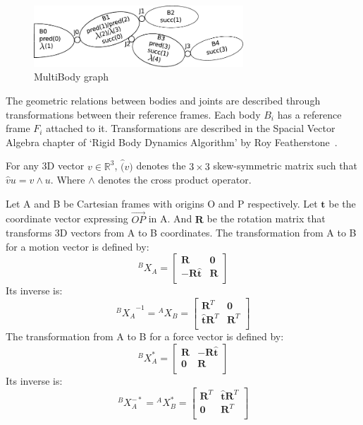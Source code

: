 \begin{figure}
  \centering
  \includegraphics[width=0.7\textwidth]{mbg.pdf}
  \caption{MultiBody graph}
\label{fig:mbg}
\end{figure}

The geometric relations between bodies and joints are described through transformations between their reference frames. Each body $B_i$ has a reference frame $F_i$ attached to it. Transformations are described in the Spacial Vector Algebra chapter of `Rigid Body Dynamics Algorithm' by Roy Featherstone~\cite{featherstone:book:2007}.

For any 3D vector $v\in\mathbb{R}^3$, $\hat(v)$ denotes the $3\times 3$ skew-symmetric matrix such that $\hat{v}u = v\wedge u$. Where $\wedge$ denotes the cross product operator.

Let A and B be Cartesian frames with origins O and P respectively. Let $\mathbf{t}$ be the coordinate vector expressing $\overrightarrow{OP}$ in A. And $\mathbf{R}$ be the rotation matrix that transforms 3D vectors from A to B coordinates.
The transformation from A to B for a motion vector is defined by:
\begin{equation}
  {}^B X_A =
  \begin{bmatrix}
    \mathbf{R} & \mathbf{0} \\
    -\mathbf{R}\hat{\mathbf{t}} & \mathbf{R} \\
  \end{bmatrix}
\end{equation}
Its inverse is:
\begin{equation}
  {{}^B X_A}^{-1} = {}^A X_B =
  \begin{bmatrix}
    \mathbf{R}^T & \mathbf{0} \\
    \hat{\mathbf{t}}\mathbf{R}^T & \mathbf{R}^T \\
  \end{bmatrix}
\end{equation}
The transformation from A to B for a force vector is defined by:
\begin{equation}
  {}^B X_A^* =
  \begin{bmatrix}
    \mathbf{R} & -\mathbf{R}\hat{\mathbf{t}} \\
    \mathbf{0} & \mathbf{R} \\
  \end{bmatrix}
\end{equation}
Its inverse is:
\begin{equation}
  {}^B X_A^{-*} = {}^A X_B^* =
  \begin{bmatrix}
    \mathbf{R}^T & \hat{\mathbf{t}}\mathbf{R}^T \\
    \mathbf{0} & \mathbf{R}^T \\
  \end{bmatrix}
\end{equation}

